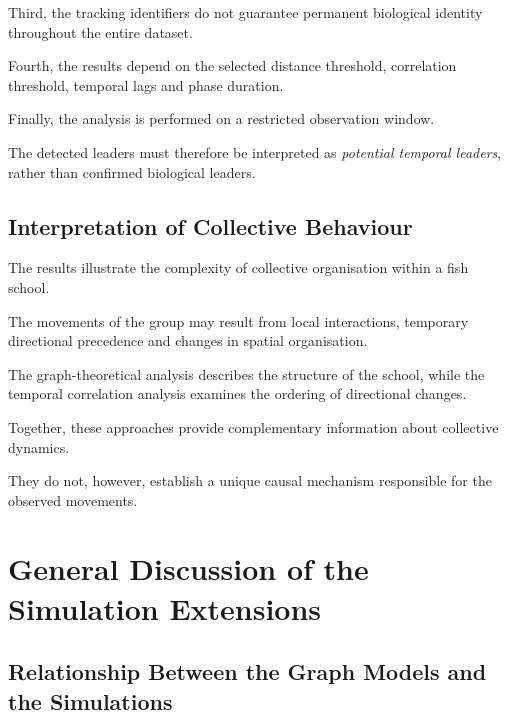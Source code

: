 \documentclass[10pt,a4paper]{article}
\newcommand{\esp}{\vspace*{2\bigskipamount}}
\begin{document}
Third, the tracking
identifiers do not
guarantee permanent
biological identity
throughout the entire
dataset.

Fourth, the results
depend on the selected
distance threshold,
correlation threshold,
temporal lags and
phase duration.

Finally, the analysis
is performed on a
restricted observation
window.

The detected leaders
must therefore be
interpreted as
\emph{potential temporal
leaders}, rather than
confirmed biological
leaders.

\subsection{Interpretation of Collective Behaviour}

The results illustrate
the complexity of
collective organisation
within a fish school.

The movements of the
group may result from
local interactions,
temporary directional
precedence and changes
in spatial organisation.

The graph-theoretical
analysis describes
the structure of the
school, while the
temporal correlation
analysis examines
the ordering of
directional changes.

Together, these approaches
provide complementary
information about
collective dynamics.

They do not, however,
establish a unique
causal mechanism
responsible for the
observed movements.

\esp


\section{General Discussion of the Simulation Extensions}
\label{app:bonus-discussion}
\subsection{Relationship Between the Graph Models
and the Simulations}
\end{document}
